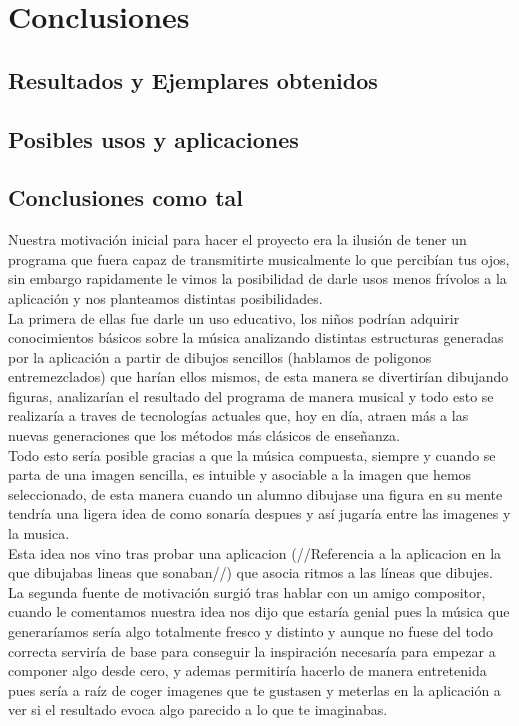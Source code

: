 \chapter{Conclusiones}

\section{Resultados y Ejemplares obtenidos}

\section{Posibles usos y aplicaciones}


\section{Conclusiones como tal}


Nuestra motivación inicial para hacer el proyecto era la ilusión de tener un programa que fuera capaz de transmitirte musicalmente lo que percibían tus ojos, sin embargo rapidamente le vimos la posibilidad de darle usos menos frívolos a la aplicación y nos planteamos distintas posibilidades.
\newline
\\La primera de ellas fue darle un uso educativo, los niños podrían adquirir conocimientos básicos sobre la música analizando distintas estructuras generadas por la aplicación a partir de dibujos sencillos (hablamos de poligonos entremezclados) que harían ellos mismos, de esta manera se divertirían dibujando figuras, analizarían el resultado del programa de manera musical y todo esto se realizaría a traves de tecnologías actuales que,  hoy en día, atraen más a las nuevas generaciones que los métodos más clásicos de enseñanza.
\newline
\\Todo esto sería posible gracias a que la música compuesta, siempre y cuando se parta de una imagen sencilla, es intuible y asociable a la imagen que hemos seleccionado, de esta manera cuando un alumno dibujase una figura en su mente tendría una ligera idea de como sonaría despues y así jugaría entre las imagenes y la musica.
\\Esta idea nos vino tras probar una aplicacion (//Referencia a la aplicacion en la que dibujabas lineas que sonaban//) que asocia ritmos a las líneas que dibujes.
\newline
\\La segunda fuente de motivación surgió tras hablar con un amigo compositor, cuando le comentamos nuestra idea nos dijo que estaría genial pues la música que generaríamos sería algo totalmente fresco y distinto y aunque no fuese del todo correcta serviría de base para conseguir la inspiración necesaría para empezar a componer algo desde cero, y ademas permitiría hacerlo de manera entretenida pues sería  a raíz de coger imagenes que te gustasen y meterlas en la aplicación a ver si el resultado evoca algo parecido a lo que te imaginabas.

